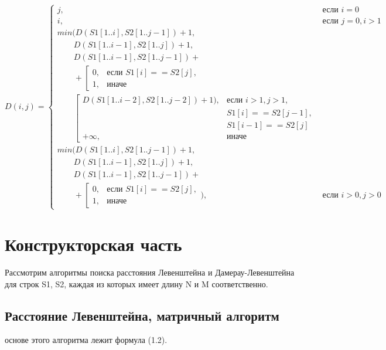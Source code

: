 \documentclass[12pt]{report}
\begin{document}
\begin{equation}
	D(i,j) = \left\{ \begin{array}{ll}
		j, & \textrm{$\mbox{если }i = 0$}\\
		i, & \textrm{$\mbox{если }j = 0, i > 1$}\\ 
		min(D(S1[1..i], S2[1.. j - 1]) + 1,\\
		\qquad D(S1[1..i - 1], S2[1..j]) + 1,\\
		\qquad D(S1[1..i - 1], S2[1..j - 1]) + \\
		\qquad+\left[ 
		\begin{array}{ccc}
			0, & \textrm{$\mbox{если }S1[i] == S2[j],$}\\
			1, & \textrm{иначе}
		\end{array} 
		\right.\\
		\qquad \left[
		\begin{array}{ccc}
			D(S1[1..i - 2], S2[1..j - 2]) + 1), & \textrm{$\mbox{если }i > 1, j > 1,$}\\
			& \textrm{$S1[i] == S2[j - 1],$}\\
			& \textrm{$S1[i - 1] == S2[j]$}\\
			+{\infty}, & \textrm{иначе}
		\end{array}
	\right.\\
		
		min(D(S1[1..i], S2[1..j - 1]) + 1,\\
		\qquad D(S1[1..i - 1], S2[1..j]) + 1, \\
		\qquad D(S1[1..i - 1], S2[1..j - 1]) + \\
		\qquad+\left[ 
		\begin{array}{ccc}
			0, & \textrm{$\mbox{если }S1[i] == S2[j],$}\\
			1, & \textrm{иначе}
		\end{array} 
		\right.), &\textrm{$\mbox{если }i>0, j>0$}
	\end{array} \right.
\end{equation}

\chapter{Конструкторская часть}

Рассмотрим алгоритмы поиска расстояния Левенштейна и Дамерау-Левенштейна для строк S1, S2, каждая из которых имеет длину N и M соответственно.

\section{Расстояние Левенштейна, матричный алгоритм}
 основе этого алгоритма лежит формула (1.2). \\
\end{document}
